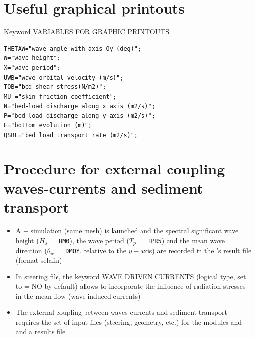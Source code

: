\section{Useful graphical printouts}
Keyword {\ttfamily VARIABLES FOR GRAPHIC PRINTOUTS}:
\begin{lstlisting}[frame=trBL]  
THETAW="wave angle with axis Oy (deg)";
W="wave height";
X="wave period";
UWB="wave orbital velocity (m/s)";
TOB="bed shear stress(N/m2)";
MU ="skin friction coefficient";
N="bed-load discharge along x axis (m2/s)";
P="bed-load discharge along y axis (m2/s)";
E="bottom evolution (m)";
QSBL="bed load transport rate (m2/s)";
\end{lstlisting}

\section{Procedure for external coupling waves-currents and sediment transport}
\begin{itemize}
\item A  $+$ \tomawac{} simulation (same mesh) is launched and the spectral significant wave height ($H_s =$ \texttt{HM0}), the wave period ($T_p =$ \texttt{TPR5}) and the mean wave direction ($\theta_w =$ \texttt{DMOY}, relative to the $y-$axis) are recorded in the \tomawac{}'s result file (format selafin)

\item In  steering file, the keyword {\ttfamily WAVE DRIVEN CURRENTS} (logical type, set to {\ttfamily = NO} by default) allows to incorporate the influence of radiation stresses in the mean flow (wave-induced currents)

\item The external coupling between waves-currents and sediment transport requires the set of input files (steering, geometry, etc.) for the modules  and \sisyphe{} and a results file \tomawac{} 



\end{itemize}

